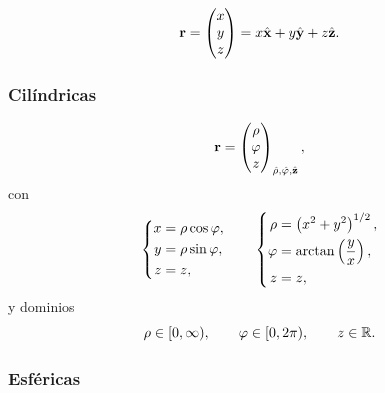 \begin{equation}
  \label{eq:cartesianas_3d}
  \mathbf{r}=
  \begin{pmatrix}
    x\\y\\z
  \end{pmatrix}
  =x\hat{\mathbf{x}}+y\hat{\mathbf{y}}+z\hat{\mathbf{z}}.
\end{equation}

\subsubsection{Cil\'indricas}
\label{subsubsec:cilindricas}

\begin{equation}
  \label{eq:cilindricas}
  \mathbf{r}=
  \begin{pmatrix}
    \rho\\\varphi\\z
  \end{pmatrix}_{\hat{\mathbf{\rho}},\hat{\mathbf{\varphi}},\hat{\mathbf{z}}},
\end{equation}
con
\begin{equation}
  \label{eq:cilindricas_directa}
  \left\{
  \begin{aligned}
    x&=\rho\cos\varphi,\\
    y&=\rho\sin\varphi,\\
    z&=z,
  \end{aligned}
  \right.
  \qquad
  \left\{
  \begin{aligned}
    \rho&=\left( x^2+y^2 \right)^{1/2},\\
    \varphi&=\arctan\left( \frac{y}{x} \right),\\
    z&=z,
  \end{aligned}
  \right.
\end{equation}
y dominios
\begin{equation}
  \label{eq:cilindricas_dominios}
  \rho\in[0,\infty),
  \qquad
  \varphi\in[0,2\pi),
  \qquad
  z\in\mathbb{R} .
\end{equation}

\subsubsection{Esf\'ericas}
\label{subsubsec:esfericas}

